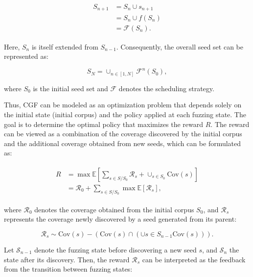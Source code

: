 \documentclass[lettersize,journal]{IEEEtran}
\begin{document}
\begin{align}
	\begin{split}
		S_{n+1} &= S_{n}\cup s_{n+1} \\
		&= S_n\cup f(S_{n}) \\
		&= \mathcal{F}(S_n).
	\end{split}
\end{align}

Here, $S_n$ is itself extended from $S_{n-1}$. Consequently, the overall seed set can be represented as:

\begin{equation}
	S_{N} = \cup_{n\in[1, N]}\mathcal{F}^n(S_0),
\end{equation}

where $S_0$ is the initial seed set and $\mathcal{F}$ denotes the scheduling strategy.

Thus, CGF can be modeled as an optimization problem that depends solely on the initial state (initial corpus) and the policy applied at each fuzzing state. The goal is to determine the optimal policy that maximizes the reward $R$. The reward can be viewed as a combination of the coverage discovered by the initial corpus and the additional coverage obtained from new seeds, which can be formulated as:

\begin{align}
	\begin{split}
		R &= \max \mathbb{E}\left[\sum_{s\in S/S_0}\mathcal{R}_{s} + \cup_{s\in S_0}\text{Cov}(s)\right] \\
		&= \mathcal{R}_0 + \sum_{s\in S/S_0} \max \mathbb{E}\left[\mathcal{R}_{s}\right],
	\end{split}
	\label{eq:recursive_reward}
\end{align}

where $\mathcal{R}_0$ denotes the coverage obtained from the initial corpus $S_0$, and $\mathcal{R}_{s}$ represents the coverage newly discovered by a seed generated from its parent:

\begin{equation}
	\mathcal{R}_{s} \sim \text{Cov}(s) - \left(\text{Cov}(s) \cap \left(\cup{s\in S_{n-1}}\text{Cov}(s)\right)\right).
\end{equation}

Let $\mathcal{S}_{n-1}$ denote the fuzzing state before discovering a new seed $s$, and $\mathcal{S}_{n}$ the state after its discovery. Then, the reward $\mathcal{R}_{s}$ can be interpreted as the feedback from the transition between fuzzing states:
\end{document}
